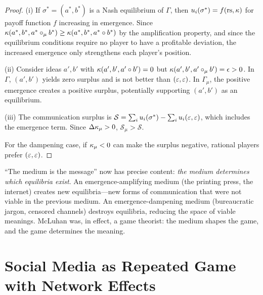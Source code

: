 \begin{proof}
(i) If $\sigma^* = (a^*, b^*)$ is a Nash equilibrium of $\Gamma$, then
$u_i(\sigma^*) = f(\mathrm{rs}, \kappa)$ for payoff function $f$ increasing in
emergence.  Since $\kappa(a^*, b^*, a^* \circ_\mu b^*) \ge
\kappa(a^*, b^*, a^* \circ b^*)$ by the amplification property,
and since the equilibrium conditions require no player to have a
profitable deviation, the increased emergence only strengthens
each player's position.

(ii) Consider ideas $a', b'$ with $\kappa(a', b', a' \circ b') = 0$
but $\kappa(a', b', a' \circ_\mu b') = \epsilon > 0$.  In $\Gamma$,
$(a', b')$ yields zero surplus and is not better than $(\varepsilon, \varepsilon)$.
In $\Gamma_\mu$, the positive emergence creates a positive surplus,
potentially supporting $(a', b')$ as an equilibrium.

(iii) The communication surplus is $\mathcal{S} = \sum_i u_i(\sigma^*) -
\sum_i u_i(\varepsilon, \varepsilon)$, which includes the emergence term.
Since $\Delta\kappa_\mu > 0$, $\mathcal{S}_\mu > \mathcal{S}$.

For the dampening case, if $\kappa_\mu < 0$ can make the surplus
negative, rational players prefer $(\varepsilon, \varepsilon)$.
\end{proof}

\begin{interpretation}
``The medium is the message'' now has precise content: \emph{the
medium determines which equilibria exist}.  An emergence-amplifying
medium (the printing press, the internet) creates new equilibria---new forms of communication that were not viable in the previous
medium.  An emergence-dampening medium (bureaucratic jargon,
censored channels) destroys equilibria, reducing the space of
viable meanings.  McLuhan was, in effect, a game theorist:
the medium shapes the game, and the game determines the meaning.
\end{interpretation}

\section{Social Media as Repeated Game with Network Effects}
\label{sec:social-media}

